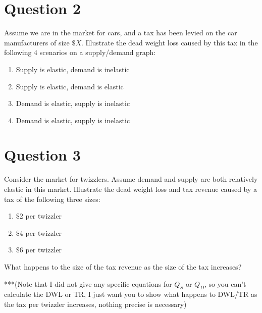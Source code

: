 \documentclass[12pt]{article}
\begin{document}
\section*{Question 2}
Assume we are in the market for cars, and a tax has been levied on the car manufacturers of size $\$X$. Illustrate the dead weight loss caused by this tax in the following 4 scenarios on a supply/demand graph:
\begin{enumerate}[label = (\alph*)]
    \item Supply is elastic, demand is inelastic
    \item Supply is elastic, demand is elastic
    \item Demand is elastic, supply is inelastic
    \item Demand is elastic, supply is inelastic
\end{enumerate}


\section*{Question 3}
Consider the market for twizzlers. Assume demand and supply are both relatively elastic in this market. Illustrate the dead weight loss and tax revenue caused by a tax of the following three sizes:
\begin{enumerate}
    \item \(\$2\) per twizzler
    \item \(\$4\) per twizzler
    \item \(\$6\) per twizzler
\end{enumerate}

What happens to the size of the tax revenue as the size of the tax increases?

\vspace{3mm}

***(Note that I did not give any specific equations for $Q_S$ or $Q_D$, so you can't calculate the DWL or TR, I just want you to show what happens to DWL/TR as the tax per twizzler increases, nothing precise is necessary)

    
\end{document}
